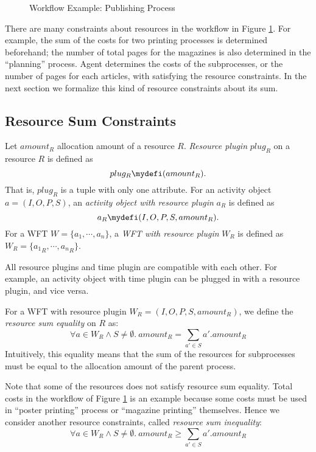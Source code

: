 \begin{figure}
\begin{center}
{\footnotesize
 \setlength{\unitlength}{0.72mm}
 
}
\end{center}
\caption{Workflow Example: Publishing Process}
\label{fig:publishwf}
\end{figure}

There are many constraints about resources in the workflow in Figure
\ref{fig:publishwf}.  For example, the sum of the costs for two printing 
processes is determined beforehand; the number of total pages for the
magazines is also determined in the ``planning'' process.  Agent
determines the costs of the subprocesses, or the number of pages for
each articles, with satisfying the resource constraints.  In the next
section we formalize this kind of resource constraints about its sum.

\subsection{Resource Sum Constraints}
\label{sec:sumconstraint}

Let $amount_R$ allocation amount of a resource $R$.  \emph{Resource
plugin} $plug_R$ on a resource $R$ is defined as
\[
 plug_R \mydefi (amount_R).
\]
That is, $plug_R$ is a tuple with only one attribute.  For an activity
object $a = (I, O, P, S)$, an \emph{activity object with resource
plugin} $a_R$ is defined as 
\[
 a_R \mydefi (I, O, P, S, amount_R).
\]
For a WFT $W=\{a_1, \cdots, a_n\}$, a \emph{WFT with resource plugin}
$W_R$ is defined as $W_R = \{{a_1}_R, \cdots, {a_n}_R\}$.

All resource plugins and time plugin are compatible with each other.
For example, an activity object with time plugin can be plugged in with
a resource plugin, and vice versa.

For a WFT with resource plugin $W_R = (I, O, P, S, amount_R)$, we define 
the \emph{resource sum equality} on $R$ as:
\[
 \forall a \in W_R \wedge S \neq \emptyset.\ 
 amount_R = \sum_{a' \in S} a'.amount_R
\]
Intuitively, this equality means that the sum of the resources for
subprocesses must be equal to the allocation amount of the parent
process.

Note that some of the resources does not satisfy resource sum equality.
Total costs in the workflow of Figure \ref{fig:publishwf} is an example
because some costs must be used in ``poster printing'' process or
``magazine printing'' themselves.  Hence we consider another
resource constraints, called \emph{resource sum inequality}:
\[
 \forall a \in W_R \wedge S \neq \emptyset.\ 
 amount_R \geq \sum_{a' \in S} a'.amount_R
\]

